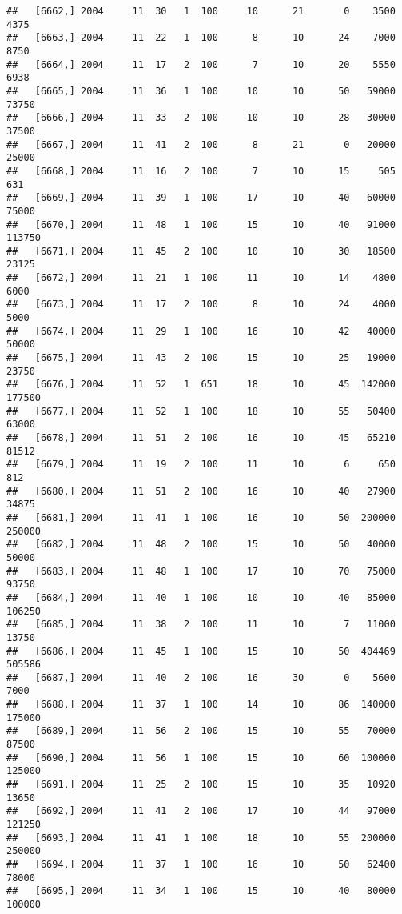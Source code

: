 \documentclass{article}\usepackage[]{graphicx}\usepackage[]{color}
\makeatletter
\newenvironment{kframe}{%
 \def\at@end@of@kframe{}%
 \ifinner\ifhmode%
  \def\at@end@of@kframe{\end{minipage}}%
  \begin{minipage}{\columnwidth}%
 \fi\fi%
 \def\FrameCommand##1{\hskip\@totalleftmargin \hskip-\fboxsep
 \colorbox{shadecolor}{##1}\hskip-\fboxsep
     \hskip-\linewidth \hskip-\@totalleftmargin \hskip\columnwidth}%
 \MakeFramed {\advance\hsize-\width
   \@totalleftmargin\z@ \linewidth\hsize
   \@setminipage}}%
 {\par\unskip\endMakeFramed%
 \at@end@of@kframe}
\newenvironment{knitrout}{}{} %
\makeatother
\begin{document}
\begin{knitrout}
\begin{kframe}
\begin{verbatim}
##   [6662,] 2004     11  30   1  100     10      21       0    3500    4375
##   [6663,] 2004     11  22   1  100      8      10      24    7000    8750
##   [6664,] 2004     11  17   2  100      7      10      20    5550    6938
##   [6665,] 2004     11  36   1  100     10      10      50   59000   73750
##   [6666,] 2004     11  33   2  100     10      10      28   30000   37500
##   [6667,] 2004     11  41   2  100      8      21       0   20000   25000
##   [6668,] 2004     11  16   2  100      7      10      15     505     631
##   [6669,] 2004     11  39   1  100     17      10      40   60000   75000
##   [6670,] 2004     11  48   1  100     15      10      40   91000  113750
##   [6671,] 2004     11  45   2  100     10      10      30   18500   23125
##   [6672,] 2004     11  21   1  100     11      10      14    4800    6000
##   [6673,] 2004     11  17   2  100      8      10      24    4000    5000
##   [6674,] 2004     11  29   1  100     16      10      42   40000   50000
##   [6675,] 2004     11  43   2  100     15      10      25   19000   23750
##   [6676,] 2004     11  52   1  651     18      10      45  142000  177500
##   [6677,] 2004     11  52   1  100     18      10      55   50400   63000
##   [6678,] 2004     11  51   2  100     16      10      45   65210   81512
##   [6679,] 2004     11  19   2  100     11      10       6     650     812
##   [6680,] 2004     11  51   2  100     16      10      40   27900   34875
##   [6681,] 2004     11  41   1  100     16      10      50  200000  250000
##   [6682,] 2004     11  48   2  100     15      10      50   40000   50000
##   [6683,] 2004     11  48   1  100     17      10      70   75000   93750
##   [6684,] 2004     11  40   1  100     10      10      40   85000  106250
##   [6685,] 2004     11  38   2  100     11      10       7   11000   13750
##   [6686,] 2004     11  45   1  100     15      10      50  404469  505586
##   [6687,] 2004     11  40   2  100     16      30       0    5600    7000
##   [6688,] 2004     11  37   1  100     14      10      86  140000  175000
##   [6689,] 2004     11  56   2  100     15      10      55   70000   87500
##   [6690,] 2004     11  56   1  100     15      10      60  100000  125000
##   [6691,] 2004     11  25   2  100     15      10      35   10920   13650
##   [6692,] 2004     11  41   2  100     17      10      44   97000  121250
##   [6693,] 2004     11  41   1  100     18      10      55  200000  250000
##   [6694,] 2004     11  37   1  100     16      10      50   62400   78000
##   [6695,] 2004     11  34   1  100     15      10      40   80000  100000

\end{verbatim}
\end{kframe}
\end{knitrout}
\end{document}
